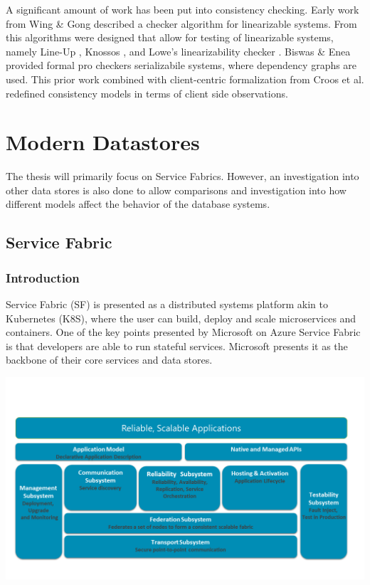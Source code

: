 \documentclass[a4paper,10pt,titlepage]{report}
\begin{document}
A significant amount of work has been put into consistency checking. Early work from Wing \& Gong \cite{winggong} described a checker algorithm for linearizable systems. From this algorithms were designed that allow for testing of linearizable systems, namely Line-Up \cite{Burckhardtetal}, Knossos \cite{Knossos}, and Lowe’s linearizability checker \cite{glowe}. Biswas \& Enea \cite{BiswasEnea} provided formal pro checkers serializabile systems, where dependency graphs are used. This prior work combined with client-centric formalization from Croos et al. \cite{CrooksPuAlvisiClement} redefined consistency models in terms of client side observations. 

    \newpage


    \chapter{Modern Datastores}

    The thesis will primarily focus on Service Fabrics. However, an investigation into other data stores is also done to allow comparisons and investigation into how different models affect the behavior of the database systems.


    \section{Service Fabric}

    \subsection{Introduction}

    Service Fabric (SF) is presented as a distributed systems platform akin to Kubernetes (K8S), where the user can build, deploy and scale microservices and containers. One of the key points presented by Microsoft on Azure Service Fabric is that developers are able to run stateful services. Microsoft presents it as the backbone of their core services and data stores.\\
    \vspace{5mm}

    \includegraphics[scale=0.5]{images/service-fabric-architecture.png}
\end{document}
